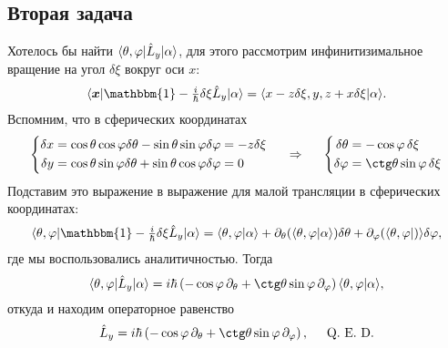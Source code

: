 \vspace{-10mm}
\subsection*{Вторая задача}


Хотелось бы найти $\bk{\theta, \varphi}[\hat{L}_y]{\alpha}$, для этого рассмотрим инфинитизимальное вращение на угол $\delta \xi$ вокруг оси $x$:
\begin{equation*}
    \bk{\vc{x}}[\mathbbm{1} - \tfrac{i}{\hbar} \delta \xi \hat{L}_y]{\alpha} = 
    \bk{x - z \delta \xi, y, z + x \delta \xi}{\alpha}.
\end{equation*}
Вспомним, что в сферических координатах
\begin{equation*}
    \left\{\begin{aligned}
        \delta x &= \cos \theta \cos \varphi \delta \theta- \sin \theta \sin \varphi \delta \varphi = - z \delta \xi \\
        \delta y &= \cos \theta \sin \varphi \delta \theta + \sin \theta \cos \varphi \delta \varphi = 0
    \end{aligned}\right.
    \hspace{0.5cm} \Rightarrow \hspace{0.5cm}
    \left\{\begin{aligned}
        \delta \theta &= - \cos \varphi \, \delta \xi \\
        \delta \varphi &= \ctg \theta \sin \varphi \, \delta \xi
    \end{aligned}\right.
\end{equation*}
Подставим это выражение в выражение для малой трансляции в сферических координатах:
\begin{equation*}
     \bk{\theta,\varphi}[\mathbbm{1} - \tfrac{i}{\hbar} \delta \xi \hat{L}_y]{\alpha} = 
     \bk{\theta,\varphi}{\alpha} + \partial_\theta (\bk{\theta, \varphi}{\alpha}) \delta \theta + \partial_\varphi (\bk{\theta, \varphi}) \delta \varphi,
\end{equation*}
где мы воспользовались аналитичностью. Тогда
\begin{equation*}
    \bk{\theta,\varphi}[\hat{L}_y]{\alpha} = i \hbar \left(
        - \cos \varphi \, \partial_\theta + \ctg \theta \sin \varphi \, \partial_\varphi
    \right) \bk{\theta,\varphi}{\alpha}, 
\end{equation*}
откуда и находим операторное равенство
\begin{equation*}
    \hat{L}_y = i \hbar \left(
        - \cos \varphi \, \partial_\theta + \ctg \theta \sin \varphi \, \partial_\varphi
    \right)
    , \hspace{5 mm} \text{Q. E. D.}
\end{equation*}